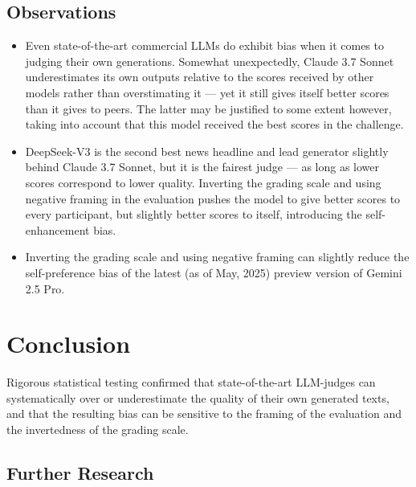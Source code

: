 \documentclass[UTF8,noindent,nohyp,parspace,titlepage,a4paper,12pt]{article}
\begin{document}
    \subsection{Observations}

      \begin{itemize}
        \item Even state-of-the-art commercial LLMs do exhibit bias when it
              comes to judging their own generations. Somewhat unexpectedly,
              Claude 3.7 Sonnet underestimates its own outputs relative to the
              scores received by other models rather than overstimating it ---
              yet it still gives itself better scores than it gives to peers.
              The latter may be justified to some extent however, taking into
              account that this model received the best scores in the
              challenge.

        \item DeepSeek-V3 is the second best news headline and lead generator
              slightly behind Claude 3.7 Sonnet, but it is the fairest judge
              --- as long as lower scores correspond to lower quality. Inverting
              the grading scale and using negative framing in the evaluation
              pushes the model to give better scores to every participant, but
              slightly better scores to itself, introducing the
              self-enhancement bias.

        \item Inverting the grading scale and using negative framing can
              slightly reduce the self-preference bias of the latest (as of May,
              2025) preview version of Gemini 2.5 Pro.
      \end{itemize}

\clearpage

  \section{Conclusion}

    Rigorous statistical testing confirmed that state-of-the-art LLM-judges can
    systematically over or underestimate the quality of their own generated
    texts, and that the resulting bias can be sensitive to the framing of the
    evaluation and the invertedness of the grading scale.

    \subsection{Further Research}
\end{document}
